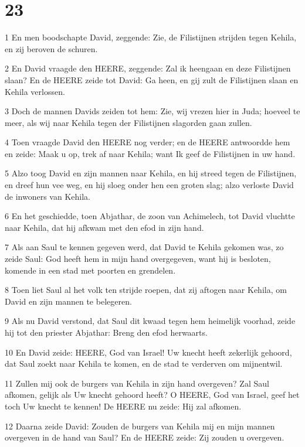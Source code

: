 \chapter{23}

\par 1 En men boodschapte David, zeggende: Zie, de Filistijnen strijden tegen Kehila, en zij beroven de schuren.
\par 2 En David vraagde den HEERE, zeggende: Zal ik heengaan en deze Filistijnen slaan? En de HEERE zeide tot David: Ga heen, en gij zult de Filistijnen slaan en Kehila verlossen.
\par 3 Doch de mannen Davids zeiden tot hem: Zie, wij vrezen hier in Juda; hoeveel te meer, als wij naar Kehila tegen der Filistijnen slagorden gaan zullen.
\par 4 Toen vraagde David den HEERE nog verder; en de HEERE antwoordde hem en zeide: Maak u op, trek af naar Kehila; want Ik geef de Filistijnen in uw hand.
\par 5 Alzo toog David en zijn mannen naar Kehila, en hij streed tegen de Filistijnen, en dreef hun vee weg, en hij sloeg onder hen een groten slag; alzo verloste David de inwoners van Kehila.
\par 6 En het geschiedde, toen Abjathar, de zoon van Achimelech, tot David vluchtte naar Kehila, dat hij afkwam met den efod in zijn hand.
\par 7 Als aan Saul te kennen gegeven werd, dat David te Kehila gekomen was, zo zeide Saul: God heeft hem in mijn hand overgegeven, want hij is besloten, komende in een stad met poorten en grendelen.
\par 8 Toen liet Saul al het volk ten strijde roepen, dat zij aftogen naar Kehila, om David en zijn mannen te belegeren.
\par 9 Als nu David verstond, dat Saul dit kwaad tegen hem heimelijk voorhad, zeide hij tot den priester Abjathar: Breng den efod herwaarts.
\par 10 En David zeide: HEERE, God van Israel! Uw knecht heeft zekerlijk gehoord, dat Saul zoekt naar Kehila te komen, en de stad te verderven om mijnentwil.
\par 11 Zullen mij ook de burgers van Kehila in zijn hand overgeven? Zal Saul afkomen, gelijk als Uw knecht gehoord heeft? O HEERE, God van Israel, geef het toch Uw knecht te kennen! De HEERE nu zeide: Hij zal afkomen.
\par 12 Daarna zeide David: Zouden de burgers van Kehila mij en mijn mannen overgeven in de hand van Saul? En de HEERE zeide: Zij zouden u overgeven.
